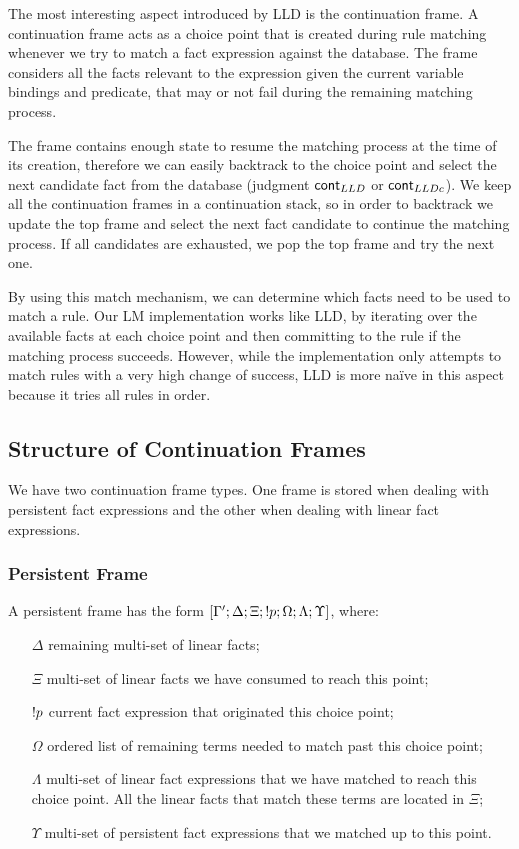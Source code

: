 The most interesting aspect introduced by LLD is the continuation frame. A continuation frame acts as a choice
point that is created during rule matching whenever we try to match a fact expression against the database.
The frame considers all the facts relevant to the expression given the current variable bindings and predicate,
that may or not fail during the remaining matching process.

The frame contains enough state to resume the matching
process at the time of its creation, therefore we can easily backtrack to the choice point and select the next candidate
fact from the database (judgment $\mathsf{cont}_{LLD}$ or $\mathsf{cont}_{LLDc}$).
We keep all the continuation frames in a continuation stack, so in order to backtrack we update the top frame and
select the next fact candidate to continue the matching process.
If all candidates are exhausted, we pop the top frame and try the next one.

By using this match mechanism, we can determine which facts need to be used to match a rule.
Our LM implementation works like LLD, by iterating over
the available facts at each choice point and then committing to the rule if the matching process
succeeds. However, while the implementation only attempts to match rules with a very high change of success,
LLD is more na\"{i}ve in this aspect because it tries all rules in order.

\subsection{Structure of Continuation Frames}

We have two continuation frame types. One frame is stored when dealing with persistent fact expressions and the other when dealing
with linear fact expressions.

\subsubsection{Persistent Frame}

A persistent frame has the form $[\Gamma'; \Delta; \Xi; {!} p; \Omega; \Lambda; \Upsilon]$, where:

\begin{enumerate}
   \item[$\Delta$] remaining multi-set of linear facts;
   \item[$\Xi$] multi-set of linear facts we have consumed to reach this point;
   \item[${!} p$] current fact expression that originated this choice point;
   \item[$\Omega$] ordered list of remaining terms needed to match past this choice point;
   \item[$\Lambda$] multi-set of linear fact expressions that we have matched to reach this choice point. All the linear facts that match these terms are located in $\Xi$;
   \item[$\Upsilon$] multi-set of persistent fact expressions that we matched up to this point.
\end{enumerate}

